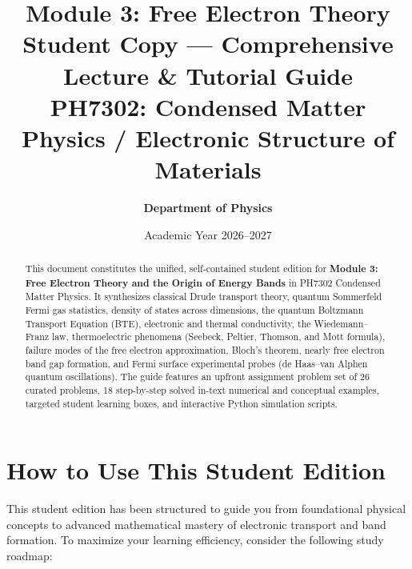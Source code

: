 \documentclass[11pt,a4paper]{article}
\begin{document}
\title{%
    \vspace{-1.5cm}
    \textbf{\LARGE Module 3: Free Electron Theory}\\[0.35cm]
    \Large Student Copy --- Comprehensive Lecture \& Tutorial Guide\\[0.25cm]
    \large\color{blue!60!black}\textbf{PH7302: Condensed Matter Physics / Electronic Structure of Materials}
}
\author{%
    \textbf{Department of Physics}\\
}
\date{Academic Year 2026--2027}
\maketitle

\vspace{-0.5cm}
\begin{abstract}
\noindent This document constitutes the unified, self-contained student edition for \textbf{Module 3: Free Electron Theory and the Origin of Energy Bands} in PH7302 Condensed Matter Physics. It synthesizes classical Drude transport theory, quantum Sommerfeld Fermi gas statistics, density of states across dimensions, the quantum Boltzmann Transport Equation (BTE), electronic and thermal conductivity, the Wiedemann--Franz law, thermoelectric phenomena (Seebeck, Peltier, Thomson, and Mott formula), failure modes of the free electron approximation, Bloch's theorem, nearly free electron band gap formation, and Fermi surface experimental probes (de Haas--van Alphen quantum oscillations). The guide features an upfront assignment problem set of 26 curated problems, 18 step-by-step solved in-text numerical and conceptual examples, targeted student learning boxes, and interactive Python simulation scripts.
\end{abstract}

\vspace{0.3cm}

\section*{How to Use This Student Edition}

This student edition has been structured to guide you from foundational physical concepts to advanced mathematical mastery of electronic transport and band formation. To maximize your learning efficiency, consider the following study roadmap:
\end{document}
